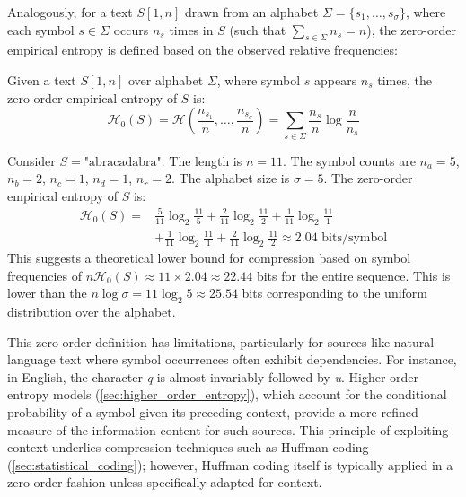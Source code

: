 Analogously, for a text $S[1, n]$ drawn from an alphabet $\Sigma = \{s_1, \dots, s_\sigma\}$, where each symbol $s \in \Sigma$ occurs $n_s$ times in $S$ (such that $\sum_{s \in \Sigma} n_s = n$), the zero-order empirical entropy is defined based on the observed relative frequencies:

\begin{definition}
    Given a text $S[1, n]$ over alphabet $\Sigma$, where symbol $s$ appears $n_s$ times, the zero-order empirical entropy of $S$ is:
    \begin{equation*}
        \mathcal{H}_0(S) = \mathcal{H} \left( \frac{n_{s_1}}{n} , \ldots, \frac{n_{s_\sigma}}{n} \right) =  \sum_{s \in \Sigma} \frac{n_s}{n} \log \frac{n}{n_s}
    \end{equation*}
\end{definition}

\begin{example}\label{ex:0_order_entropy_abracadabra}
    Consider $S = \text{"abracadabra"}$. The length is $n = 11$. The symbol counts are $n_a = 5$, $n_b = 2$, $n_c = 1$, $n_d = 1$, $n_r = 2$. The alphabet size is $\sigma=5$. The zero-order empirical entropy of $S$ is:
    \begin{align*}
        \mathcal{H}_0(S) = {} & \frac{5}{11} \log_2 \frac{11}{5} + \frac{2}{11} \log_2 \frac{11}{2} + \frac{1}{11} \log_2 \frac{11}{1} \\
                              & + \frac{1}{11} \log_2 \frac{11}{1} + \frac{2}{11} \log_2 \frac{11}{2} \approx 2.04 \text{ bits/symbol}
    \end{align*}
    This suggests a theoretical lower bound for compression based on symbol frequencies of $n \mathcal{H}_0(S) \approx 11 \times 2.04 \approx 22.44$ bits for the entire sequence. This is lower than the $n \log \sigma = 11 \log_2 5 \approx 25.54$ bits corresponding to the uniform distribution over the alphabet.
\end{example}

This zero-order definition has limitations, particularly for sources like natural language text where symbol occurrences often exhibit dependencies. For instance, in English, the character \emph{q} is almost invariably followed by \emph{u}. Higher-order entropy models (\autoref{sec:higher_order_entropy}), which account for the conditional probability of a symbol given its preceding context, provide a more refined measure of the information content for such sources. This principle of exploiting context underlies compression techniques such as Huffman coding (\autoref{sec:statistical_coding}); however, Huffman coding itself is typically applied in a zero-order fashion unless specifically adapted for context.
